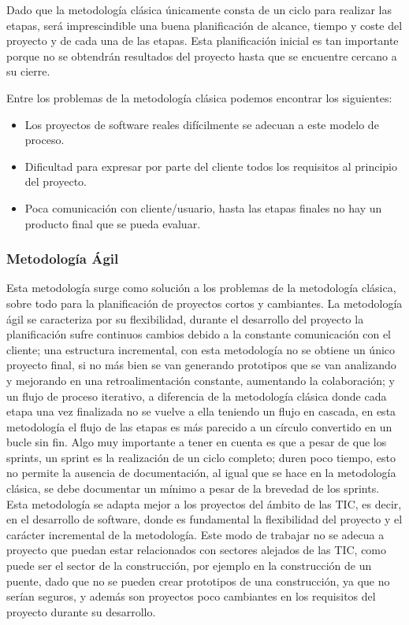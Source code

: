Dado que la metodología clásica únicamente consta de un ciclo para realizar las etapas, será imprescindible una buena planificación de alcance, tiempo y coste del proyecto y de cada una de las etapas. Esta planificación inicial es tan importante porque no se obtendrán resultados del proyecto hasta que se encuentre cercano a su cierre.

Entre los problemas de la metodología clásica podemos encontrar los siguientes:

\begin{itemize}
\item Los proyectos de software reales difícilmente se adecuan a este modelo de proceso.
\item Dificultad para expresar por parte del cliente todos los requisitos al principio del proyecto.
\item Poca comunicación con cliente/usuario, hasta las etapas finales no hay un producto final que se pueda evaluar.
\end{itemize}

\subsubsection{Metodología Ágil}

Esta metodología surge como solución a los problemas de la metodología clásica, sobre todo para la planificación de proyectos cortos y cambiantes. La metodología ágil se caracteriza por su flexibilidad, durante el desarrollo del proyecto la planificación sufre continuos cambios debido a la constante comunicación con el cliente; una estructura incremental, con esta metodología no se obtiene un único proyecto final, si no más bien se van generando \glspl{prototipo} que se van analizando y mejorando en una retroalimentación constante, aumentando la colaboración; y un flujo de proceso iterativo, a diferencia de la metodología clásica donde cada etapa una vez finalizada no se vuelve a ella teniendo un flujo en cascada, en esta metodología el flujo de las etapas es más parecido a un círculo convertido en un bucle sin fin. Algo muy importante a tener en cuenta es que a pesar de que los sprints, un sprint es la realización de un ciclo completo; duren poco tiempo, esto no permite la ausencia de documentación, al igual que se hace en la metodología clásica, se debe documentar un mínimo a pesar de la brevedad de los sprints. Esta metodología se adapta mejor a los proyectos del ámbito de las \gls{TIC}, es decir, en el desarrollo de software, donde es fundamental la flexibilidad del proyecto y el carácter incremental de la metodología. Este modo de trabajar no se adecua a proyecto que puedan estar relacionados con sectores alejados de las \gls{TIC}, como puede ser el sector de la construcción, por ejemplo en la construcción de un puente, dado que no se pueden crear \glspl{prototipo} de una construcción, ya que no serían seguros, y además son proyectos poco cambiantes en los requisitos del proyecto durante su desarrollo.

